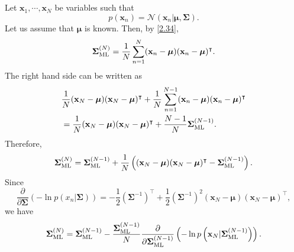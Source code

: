 \subsection{}
\label{2.37}
Let $\mathbf{x}_1, \cdots, \mathbf{x}_N$ be variables such that
%
\begin{equation}
p(\mathbf{x}_n)
=
\mathcal{N}
\left(
	\mathbf{x}_n
	|
	\bm{\mu},
	\bm{\Sigma}
\right).
\end{equation}
%
Let us assume that $\bm{\mu}$ is known.
Then, by \ref{2.34},
%
\begin{equation}
\bm{\Sigma}_{\rm ML} ^ {(N)}
=
\frac{1}{N}
\sum_{n = 1}^{N}
(\mathbf{x}_n - \bm{\mu})
(\mathbf{x}_n - \bm{\mu}) ^ \intercal.
\end{equation}
%
The right hand side can be written as
%
\begin{equation}
\begin{aligned}
&\frac{1}{N}
(\mathbf{x}_N - \bm{\mu})
(\mathbf{x}_N - \bm{\mu}) ^ \intercal
+
\frac{1}{N}
\sum_{n = 1}^{N - 1}
(\mathbf{x}_n - \bm{\mu})
(\mathbf{x}_n - \bm{\mu}) ^ \intercal 
\\
&=
\frac{1}{N}
(\mathbf{x}_N - \bm{\mu})
(\mathbf{x}_N - \bm{\mu}) ^ \intercal
+
\frac{N - 1}{N}
\bm{\Sigma}_{\rm ML} ^ {(N - 1)}.
\end{aligned}
\end{equation}
%
Therefore,
%
\begin{equation}
\bm{\Sigma}_{\rm ML} ^ {(N)}
=
\bm{\Sigma}_{\rm ML} ^ {(N - 1)}
+
\frac{1}{N}
\left(
	(\mathbf{x}_N - \bm{\mu})
	(\mathbf{x}_N - \bm{\mu}) ^ \intercal
	-
	\bm{\Sigma}_{\rm ML} ^ {(N - 1)}
\right).
\end{equation}
%
Since
%
\begin{equation}
\frac{\partial}{\partial \bm{\Sigma}} 
\left(
	- \ln p (x_n | \bm{\Sigma})
\right)
=
-
\frac{1}{2}
\left(
	\bm{\Sigma} ^ {- 1}
\right) ^ \intercal
+
\frac{1}{2}
\left(
	\bm{\Sigma} ^ {- 1}
\right) ^ 2
(\mathbf{x}_N - \bm{\mu})
(\mathbf{x}_N - \bm{\mu}) ^ \intercal,
\end{equation}
%
we have
%
\begin{equation}
\bm{\Sigma}_{\rm ML} ^ {(N)}
=
\bm{\Sigma}_{\rm ML} ^ {(N - 1)}
-
\frac{\bm{\Sigma}_{\rm ML} ^ {(N - 1)}}{N}
\frac{\partial}{\partial \bm{\Sigma}_{\rm ML} ^ {(N - 1)}} 
\left(
	- \ln p
	\left(
		\mathbf{x}_N 
		| 
		\bm{\Sigma}_{\rm ML} ^ {(N - 1)}
	\right)
\right).
\end{equation}
%


